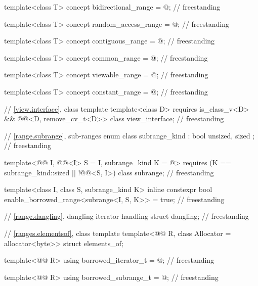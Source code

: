 \begin{codeblock}
{  template<class T>
    concept bidirectional_range = @\seebelow@;                                        // freestanding

  template<class T>
    concept random_access_range = @\seebelow@;                                        // freestanding

  template<class T>
    concept contiguous_range = @\seebelow@;                                           // freestanding

  template<class T>
    concept common_range = @\seebelow@;                                               // freestanding

  template<class T>
    concept viewable_range = @\seebelow@;                                             // freestanding

  template<class T>
    concept constant_range = @\seebelow@;                                             // freestanding

  // \ref{view.interface}, class template 
  template<class D>
    requires is_class_v<D> && @@<D, remove_cv_t<D>>
  class view_interface;                                                             // freestanding

  // \ref{range.subrange}, sub-ranges
  enum class subrange_kind : bool { unsized, sized };                               // freestanding

  template<@@ I, @@<I> S = I, subrange_kind K = @\seebelow@>
    requires (K == subrange_kind::sized || !@@<S, I>)
  class subrange;                                                                   // freestanding

  template<class I, class S, subrange_kind K>
    inline constexpr bool enable_borrowed_range<subrange<I, S, K>> = true;          // freestanding

  // \ref{range.dangling}, dangling iterator handling
  struct dangling;                                                                  // freestanding

  // \ref{ranges.elementsof}, class template 
  template<@@ R, class Allocator = allocator<byte>>
    struct elements_of;

  template<@@ R>
    using borrowed_iterator_t = @\seebelow@;                                          // freestanding

  template<@@ R>
    using borrowed_subrange_t = @\seebelow@;                                          // freestanding

}
\end{codeblock}
